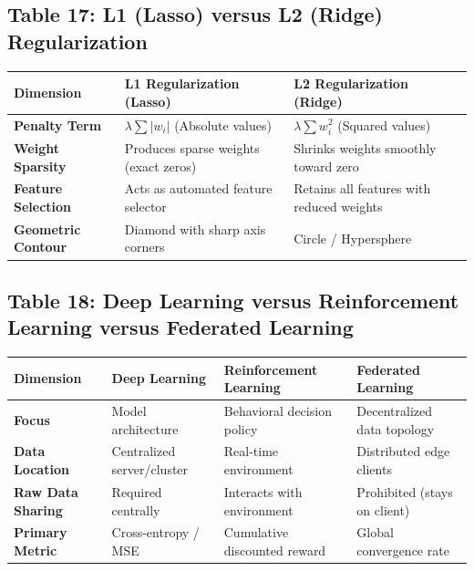 \subsection*{Table 17: L1 (Lasso) versus L2 (Ridge) Regularization}
\begin{center}
\small
\begin{tabularx}{\textwidth}{lXX}
\toprule
\textbf{Dimension} & \textbf{L1 Regularization (Lasso)} & \textbf{L2 Regularization (Ridge)} \\
\midrule
\textbf{Penalty Term} & $\lambda \sum |w_i|$ (Absolute values) & $\lambda \sum w_i^2$ (Squared values) \\
\textbf{Weight Sparsity} & Produces sparse weights (exact zeros) & Shrinks weights smoothly toward zero \\
\textbf{Feature Selection} & Acts as automated feature selector & Retains all features with reduced weights \\
\textbf{Geometric Contour} & Diamond with sharp axis corners & Circle / Hypersphere \\
\bottomrule
\end{tabularx}
\end{center}

\subsection*{Table 18: Deep Learning versus Reinforcement Learning versus Federated Learning}
\begin{center}
\small
\begin{tabularx}{\textwidth}{lXXX}
\toprule
\textbf{Dimension} & \textbf{Deep Learning} & \textbf{Reinforcement Learning} & \textbf{Federated Learning} \\
\midrule
\textbf{Focus} & Model architecture & Behavioral decision policy & Decentralized data topology \\
\textbf{Data Location} & Centralized server/cluster & Real-time environment & Distributed edge clients \\
\textbf{Raw Data Sharing} & Required centrally & Interacts with environment & Prohibited (stays on client) \\
\textbf{Primary Metric} & Cross-entropy / MSE & Cumulative discounted reward & Global convergence rate \\
\bottomrule
\end{tabularx}
\end{center}

